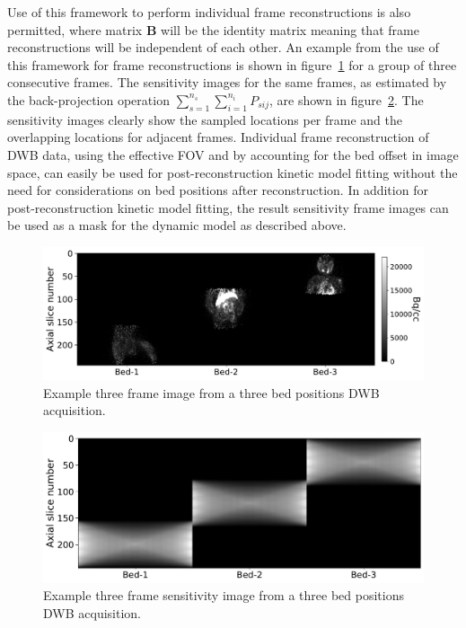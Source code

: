 Use of this framework to perform individual frame reconstructions is also permitted, where matrix $\boldsymbol{B}$ will be the identity matrix meaning that frame reconstructions will be independent of each other. 
An example from the use of this framework for frame reconstructions is shown in figure~\ref{fig_3_3:Macaque} for a group of three consecutive frames. The sensitivity images for the same frames, as estimated by the back-projection operation $\sum_{s=1}^{n_s} \sum_{i=1}^{n_i} P_{sij}$, are shown in figure~\ref{fig_3_3:Macaque_Sensitivity}.
The sensitivity images clearly show the sampled locations per frame and the overlapping locations for adjacent frames. 
Individual frame reconstruction of DWB data, using the effective FOV and by accounting for the bed offset in image space, can easily be used for post-reconstruction kinetic model fitting without the need for considerations on bed positions after reconstruction. In addition for post-reconstruction kinetic model fitting, the result sensitivity frame images can be used as a mask for the dynamic model as described above. 

%
\begin{figure} [h!]
\includegraphics[scale=0.5,angle=0]{3_Results/3_3_DWB_Reconstruction/figures/Macaque_3D.pdf}
\caption{Example three frame image from a three bed positions DWB acquisition.} 
\label{fig_3_3:Macaque}
\end{figure} 
%
\begin{figure} [h!]
\includegraphics[scale=0.42,angle=0]{3_Results/3_3_DWB_Reconstruction/figures/Macaque_Sensitivity.pdf}
\caption{Example three frame sensitivity image from a three bed positions DWB acquisition.} 
\label{fig_3_3:Macaque_Sensitivity}
\end{figure} 
%


